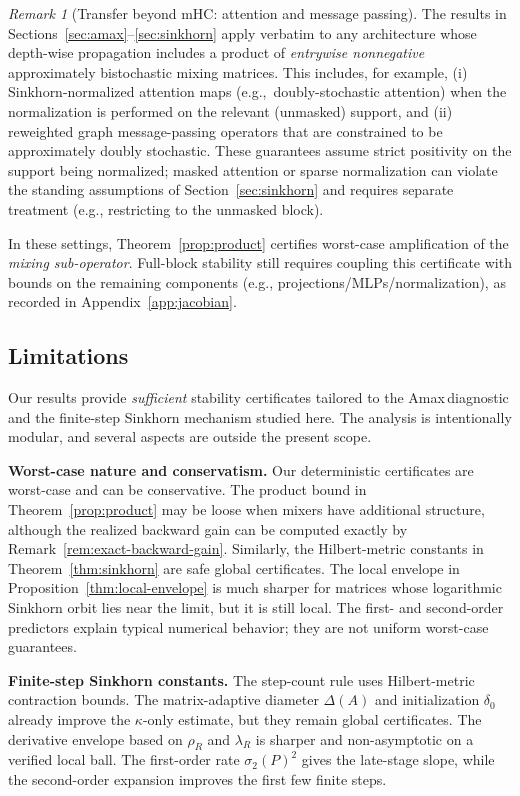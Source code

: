 \documentclass[11pt]{article}
\numberwithin{equation}{section}
\theoremstyle{plain}
\theoremstyle{definition}
\theoremstyle{remark}
\newtheorem{remark}[theorem]{Remark}
\newcommand{\Amax}{\textsf{Amax}\,}
\begin{document}
\begin{remark}[Transfer beyond mHC: attention and message passing] 
The results in Sections~\ref{sec:amax}--\ref{sec:sinkhorn} apply verbatim to any architecture whose depth-wise propagation includes
a product of \emph{entrywise nonnegative} approximately bistochastic mixing matrices. This includes, for example,
(i) Sinkhorn-normalized attention maps (e.g.,\ doubly-stochastic attention) when the normalization is performed on the relevant
(unmasked) support, and (ii) reweighted graph message-passing operators that are constrained to be approximately doubly stochastic.
These guarantees assume strict positivity on the support being normalized; masked attention or sparse normalization can violate
the standing assumptions of Section~\ref{sec:sinkhorn} and requires separate treatment (e.g., restricting to the unmasked block).

In these settings, Theorem~\ref{prop:product} certifies worst-case amplification of the \emph{mixing sub-operator}.
Full-block stability still requires coupling this certificate with bounds on the remaining components
(e.g., projections/MLPs/normalization), as recorded in Appendix~\ref{app:jacobian}.
\end{remark}


\subsection{Limitations}\label{subsec:limitations}
Our results provide \emph{sufficient} stability certificates tailored to the \Amax diagnostic and the finite-step Sinkhorn
mechanism studied here. The analysis is intentionally modular, and several aspects are outside the present scope.

\noindent\textbf{Worst-case nature and conservatism.}
Our deterministic certificates are worst-case and can be conservative. The product bound in Theorem~\ref{prop:product} may be loose when mixers have additional structure, although the realized backward gain can be computed exactly by Remark~\ref{rem:exact-backward-gain}. Similarly, the Hilbert-metric constants in Theorem~\ref{thm:sinkhorn} are safe global certificates. The local envelope in Proposition~\ref{thm:local-envelope} is much sharper for matrices whose logarithmic Sinkhorn orbit lies near the limit, but it is still local. The first- and second-order predictors explain typical numerical behavior; they are not uniform worst-case guarantees.

\noindent\textbf{Finite-step Sinkhorn constants.}
The step-count rule uses Hilbert-metric contraction bounds. The matrix-adaptive diameter $\Delta(A)$ and initialization $\delta_0$ already improve the $\kappa$-only estimate, but they remain global certificates. The derivative envelope based on $\rho_R$ and $\lambda_R$ is sharper and non-asymptotic on a verified local ball. The first-order rate $\sigma_2(P)^2$ gives the late-stage slope, while the second-order expansion improves the first few finite steps.
\end{document}
